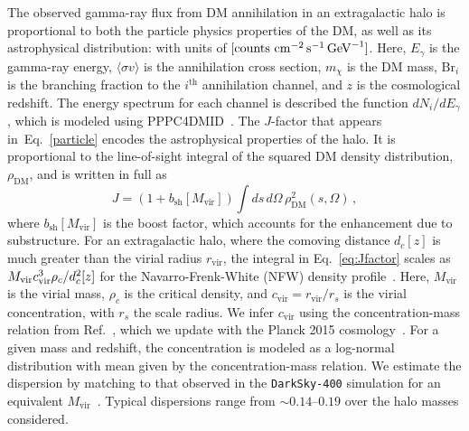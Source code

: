 The observed gamma-ray flux from DM annihilation in an extragalactic halo is proportional to both the particle physics properties of the DM, as well as its astrophysical distribution:
with units of $[{\rm counts} \,\,{\rm cm}^{-2} \, {\rm s}^{-1} \, {\rm GeV}^{-1}]$.  Here, $E_\gamma$ is the gamma-ray energy, $\langle \sigma v \rangle$ is the annihilation cross section, $m_\chi$ is the DM mass, $\text{Br}_{i}$ is the branching fraction to the $i^\text{th}$ annihilation channel, and $z$ is the cosmological redshift.  The energy spectrum for each channel is described the function $dN_{i}/dE_{\gamma}$, which is modeled using PPPC4DMID~\cite{Cirelli:2010xx}.  The $J$-factor that appears in~Eq.~\ref{particle} encodes the astrophysical properties of the halo.  It is proportional to the line-of-sight integral of the squared DM density distribution, $\rho_\text{DM}$, and is written in full as 
\begin{equation}
J = \left(1+b_\text{sh}[M_\text{vir}] \right)  \int ds\,d \Omega \,\rho^{2}_\text{DM}(s,\Omega) \, ,
\label{eq:Jfactor}
\end{equation}
where $b_\text{sh}[M_\text{vir}]$ is the boost factor, which accounts for the enhancement due to substructure.  For an extragalactic halo, where the comoving distance $d_c[z]$ is much greater than the virial radius $r_\text{vir}$, the integral in Eq.~\ref{eq:Jfactor} scales as $M_{\rm vir} c_{\rm vir}^3\rho_c/d_c^2[z]$ for the Navarro-Frenk-White (NFW) density profile~\cite{Navarro:1996gj}.  Here, $M_\text{vir}$ is the virial mass, $\rho_c$ is the critical density, and $c_\text{vir}=r_\text{vir}/r_s$ is the virial concentration, with $r_s$ the scale radius.  We infer $c_\text{vir}$ using the concentration-mass relation from Ref.~\cite{Correa:2015dva}, which we update with the Planck 2015 cosmology~\cite{Ade:2015xua}.  
For a given mass and redshift, the concentration is modeled as a log-normal distribution with mean given by the concentration-mass relation.  We estimate the dispersion by matching to that observed in the \texttt{DarkSky-400} simulation for an equivalent $M_\text{vir}$~\cite{Lehmann:2015ioa}.  Typical dispersions range from $\sim$$0.14$--$0.19$ over the halo masses considered. 

